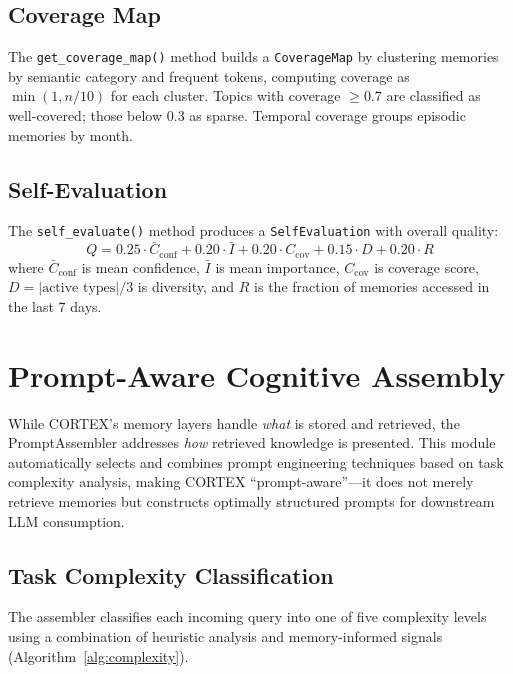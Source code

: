 \documentclass[runningheads]{llncs}
\begin{document}
\subsection{Coverage Map}

The \texttt{get\_coverage\_map()} method builds a \texttt{CoverageMap} by clustering memories by semantic category and frequent tokens, computing coverage as $\min(1, n/10)$ for each cluster. Topics with coverage $\geq 0.7$ are classified as well-covered; those below 0.3 as sparse. Temporal coverage groups episodic memories by month.

\subsection{Self-Evaluation}

The \texttt{self\_evaluate()} method produces a \texttt{SelfEvaluation} with overall quality:
\begin{equation}\label{eq:quality}
    Q = 0.25 \cdot \bar{C}_{\text{conf}} + 0.20 \cdot \bar{I} + 0.20 \cdot C_{\text{cov}} + 0.15 \cdot D + 0.20 \cdot R
\end{equation}
where $\bar{C}_{\text{conf}}$ is mean confidence, $\bar{I}$ is mean importance, $C_{\text{cov}}$ is coverage score, $D = |\text{active types}|/3$ is diversity, and $R$ is the fraction of memories accessed in the last 7 days.

\section{Prompt-Aware Cognitive Assembly}\label{sec:prompt}

While CORTEX's memory layers handle \textit{what} is stored and retrieved, the PromptAssembler addresses \textit{how} retrieved knowledge is presented. This module automatically selects and combines prompt engineering techniques based on task complexity analysis, making CORTEX ``prompt-aware''---it does not merely retrieve memories but constructs optimally structured prompts for downstream LLM consumption.

\subsection{Task Complexity Classification}

The assembler classifies each incoming query into one of five complexity levels using a combination of heuristic analysis and memory-informed signals (Algorithm~\ref{alg:complexity}).
\end{document}
